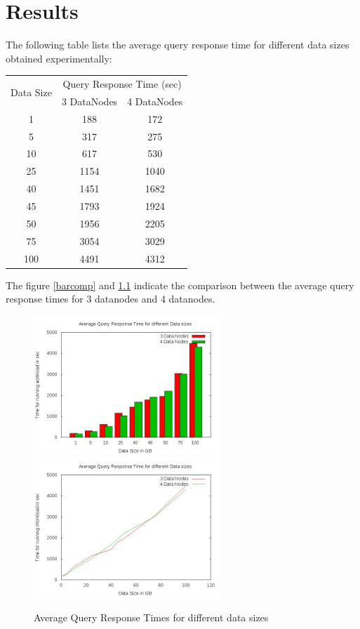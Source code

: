 \documentclass[12pt]{book}
\begin{document}
\chapter{Results}
The following table lists the average query response time for different data sizes obtained experimentally:
\begin{center}
\begin{tabular}{|c|c|c|}\hline
\multirow{2}{*}{Data Size} & \multicolumn{2}{c|}{Query Response Time (sec)}\\
\cline{2-3}
& 3 DataNodes & 4 DataNodes\\\hline
1 & 188 & 172\\
5 & 317 & 275\\
10 & 617 & 530\\
25 & 1154 & 1040\\
40 & 1451 & 1682\\
45 & 1793 & 1924\\
50 & 1956 & 2205\\
75 & 3054 & 3029\\
100 & 4491 & 4312\\\hline
\end{tabular}
\end{center}

The figure \ref{barcomp} and \ref{linecomp} indicate the comparison between the average query response times for 3 datanodes and 4 datanodes.
\begin{figure}[h]
 \centering
 \subfigure
 {
 \includegraphics[width=7cm]{bar_comparison.jpeg}
 \label{barcomp}
 }
 \subfigure
 {
 \includegraphics[width=7cm]{line_comparison.jpeg}
 \label{linecomp}
 }
\caption{Average Query Response Times for different data sizes}
\end{figure}
\end{document}
